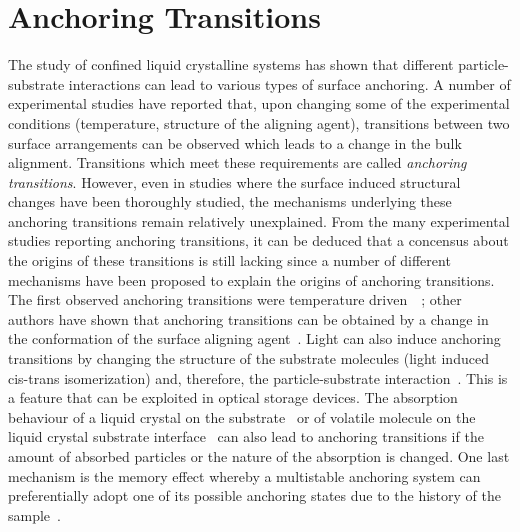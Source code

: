 
\section{Anchoring Transitions}

The study of confined liquid crystalline systems has shown that different
particle-substrate interactions can lead to various types of surface anchoring. 
A number of experimental 
studies have reported that, upon changing some of the experimental conditions (\ie temperature,
structure of the aligning agent), transitions between two  surface arrangements can be observed
which leads to a change in the bulk alignment. 
Transitions which meet these requirements
are called \emph{anchoring transitions}. However, even in studies where the surface induced 
structural changes have been thoroughly studied, the mechanisms underlying these anchoring 
transitions remain relatively unexplained.
From the many experimental studies reporting anchoring transitions, it can be deduced that
 a concensus about the origins of these transitions is still lacking since a number of 
different mechanisms have been proposed to explain the origins of anchoring
transitions.\\ 

The first observed anchoring transitions were temperature  
driven~\cite{PatelYokoyama93,JagemalmKomitov1997}~; other authors have shown that anchoring
transitions can be obtained by a change in the conformation of the surface aligning
agent~\cite{ZhuLu94,ZhuWei94}. Light can also induce anchoring transitions by changing the
structure of the substrate molecules (\eg light induced cis-trans isomerization) and, therefore, the 
particle-substrate interaction~\cite{BarberoPopaNita00}. This is a feature that can be exploited
in optical storage devices. The absorption behaviour of a liquid crystal on the 
substrate~\cite{AlkhairallaAllison99,AlkhairallaBoden02} or of volatile molecule on the 
liquid crystal substrate interface~\cite{Jerome93} can also lead to anchoring transitions if the 
amount of absorbed particles  or the nature of the  absorption is changed.
One last mechanism is the memory effect whereby a multistable
anchoring system can preferentially adopt one of its possible anchoring states due to the history 
of the sample~\cite{Jerome91,StoenescuMartinotLagarde99}.\\

